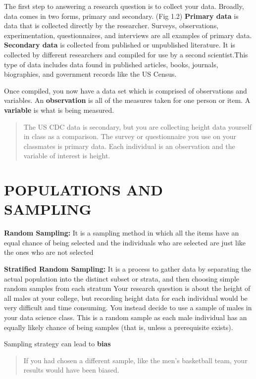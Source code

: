 \documentclass[
]{book}
\begin{document}
The first step to answering a research question is to collect
your data. Broadly, data comes in two forms, primary and
secondary. (Fig 1.2) \textbf{Primary data} is data that is collected
directly by the researcher. Surveys, observations,
experimentation, questionnaires, and interviews are all examples
of primary data. \textbf{Secondary data} is collected from published
or unpublished literature. It is collected by different
researchers and compiled for use by a second scientist.This type
of data includes data found in published articles, books,
journals, biographies, and government records like the US Census.

Once compiled, you now have a data set which is comprised of
observations and variables. An \textbf{observation} is all of the
measures taken for one person or item. A \textbf{variable} is what is
being measured.

\begin{quote}
The US CDC data is secondary, but you are collecting height
data yourself in class as a comparison. The survey or
questionnaire you use on your classmates is primary data. Each
individual is an observation and the variable of interest is
height.
\end{quote}

\hypertarget{populations-and-sampling}{%
\section{POPULATIONS AND SAMPLING}\label{populations-and-sampling}}

\textbf{Random Sampling:} It is a sampling method in which all the
items have an equal chance of being selected and the individuals
who are selected are just like the ones who are not selected

\textbf{Stratified Random Sampling:} It is a process to gather data by
separating the actual population into the distinct subset or
strata, and then choosing simple random samples from each stratum
Your research question is about the height of all males at your
college, but recording height data for each individual would be
very difficult and time consuming. You instead decide to use a
sample of males in your data science class. This is a random
sample as each male individual has an equally likely chance of
being samples (that is, unless a prerequisite exists).

Sampling strategy can lead to \textbf{bias}

\begin{quote}
If you had chosen a different sample, like the men's basketball
team, your results would have been biased.
\end{quote}
\end{document}
